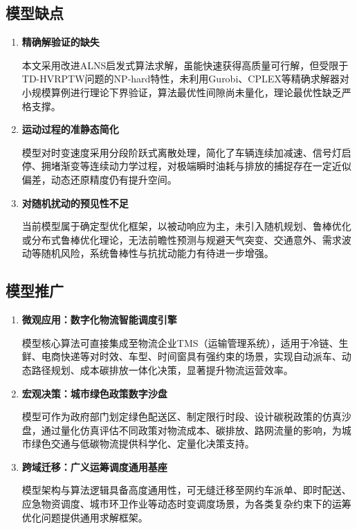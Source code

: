 \documentclass[12pt,a4paper]{article}
\begin{document}
\subsection{模型缺点}
\begin{enumerate}
    \item \textbf{精确解验证的缺失}

    本文采用改进ALNS启发式算法求解，虽能快速获得高质量可行解，但受限于TD-HVRPTW问题的NP-hard特性，未利用Gurobi、CPLEX等精确求解器对小规模算例进行理论下界验证，算法最优性间隙尚未量化，理论最优性缺乏严格支撑。
    
    \item \textbf{运动过程的准静态简化}
    
    模型对时变速度采用分段阶跃式离散处理，简化了车辆连续加减速、信号灯启停、拥堵渐变等连续动力学过程，对极端瞬时油耗与排放的捕捉存在一定近似偏差，动态还原精度仍有提升空间。

    \item \textbf{对随机扰动的预见性不足}

    当前模型属于确定型优化框架，以被动响应为主，未引入随机规划、鲁棒优化或分布式鲁棒优化理论，无法前瞻性预测与规避天气突变、交通意外、需求波动等随机风险，系统鲁棒性与抗扰动能力有待进一步增强。
\end{enumerate}

\subsection{模型推广}
\begin{enumerate}
    \item \textbf{微观应用：数字化物流智能调度引擎}
   
    模型核心算法可直接集成至物流企业TMS（运输管理系统），适用于冷链、生鲜、电商快递等对时效、车型、时间窗具有强约束的场景，实现自动派车、动态路径规划、成本碳排放一体化决策，显著提升物流运营效率。
    
    \item \textbf{宏观决策：城市绿色政策数字沙盘}
    
    模型可作为政府部门划定绿色配送区、制定限行时段、设计碳税政策的仿真沙盘，通过量化仿真评估不同政策对物流成本、碳排放、路网流量的影响，为城市绿色交通与低碳物流提供科学化、定量化决策支持。

    \item \textbf{跨域迁移：广义运筹调度通用基座}

    模型架构与算法逻辑具备高度通用性，可无缝迁移至网约车派单、即时配送、应急物资调度、城市环卫作业等动态时变调度场景，为各类复杂约束下的运筹优化问题提供通用求解框架。

\end{enumerate}
\end{document}
